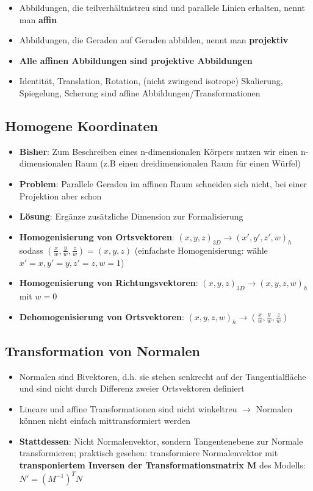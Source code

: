 \documentclass[10pt,a4paper]{article}
\begin{document}
	\begin{itemize}
		\item Abbildungen, die teilverhältnistreu sind und parallele Linien erhalten, nennt man \textbf{affin}
		\item Abbildungen, die Geraden auf Geraden abbilden, nennt man \textbf{projektiv}
		\item \textbf{Alle affinen Abbildungen sind projektive Abbildungen}
		\item Identität, Translation, Rotation, (nicht zwingend isotrope) Skalierung, Spiegelung, Scherung sind affine Abbildungen/Transformationen
	\end{itemize}

	\subsection{Homogene Koordinaten}
	\label{tf:sub:homogene_koordinaten}
	
	\begin{itemize}
		\item \textbf{Bisher}: Zum Beschreiben eines n-dimensionalen Körpers nutzen wir einen n-dimensionalen Raum (z.B einen dreidimensionalen Raum für einen Würfel)
		\item \textbf{Problem}: Parallele Geraden im affinen Raum schneiden sich nicht, bei einer Projektion aber schon
		\item \textbf{Lösung}: Ergänze zusätzliche Dimension zur Formalisierung
		\item \textbf{Homogenisierung von Ortsvektoren}: $(x, y, z)_{3D} \rightarrow (x', y', z', w)_h$ sodass $(\frac{x}{w}, \frac{y}{w}, \frac{z}{w}) = (x, y, z)$ (einfachste Homogenisierung: wähle $x' = x, y' = y, z' = z, w = 1$)
		\item \textbf{Homogenisierung von Richtungsvektoren}: $(x, y, z)_{3D} \rightarrow (x, y, z, w)_h$ mit $w = 0$
		\item \textbf{Dehomogenisierung von Ortsvektoren}: $(x, y, z, w)_h \rightarrow (\frac{x}{w}, \frac{y}{w}, \frac{z}{w})$
	\end{itemize}

	\subsection{Transformation von Normalen}
	\label{tf:sub:transformation_von_normalen}

	\begin{itemize}
		\item Normalen sind Bivektoren, d.h. sie stehen senkrecht auf der Tangentialfläche und sind nicht durch Differenz zweier Ortsvektoren definiert
		\item Lineare und affine Transformationen sind nicht winkeltreu $\rightarrow$ Normalen können nicht einfach mittransformiert werden
		\item \textbf{Stattdessen}: Nicht Normalenvektor, sondern Tangentenebene zur Normale transformieren; praktisch gesehen: transformiere Normalenvektor mit \textbf{transponiertem Inversen der Transformationsmatrix M} des Modells: $N' = (M^{-1})^T N$
	\end{itemize}
\end{document}
